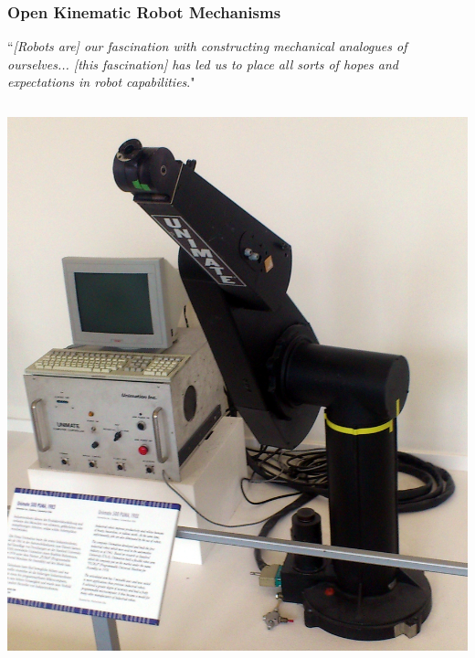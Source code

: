 	
	\begin{frame}
		\frametitle{Open Kinematic Robot Mechanisms}
		\begin{definition}
			``\footnotesize \textit{[Robots are] our fascination with constructing mechanical analogues of ourselves... [this fascination] has led us to place all sorts of hopes and expectations in robot capabilities}."
		\end{definition}
		\begin{columns}[t]
			\begin{column}{5cm}
				\begin{minipage}[b]{.5\textwidth}
					\includegraphics[width=1.5\textwidth, height=1.5\textwidth]{../Notes/figures/PUMA.jpg} \\

\end{minipage}
\end{column}
\end{columns}
\end{frame}
